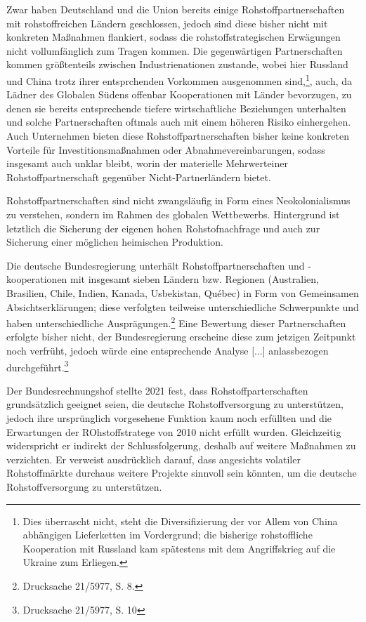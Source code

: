\documentclass[12pt,a4paper,oneside]{book} %
\begin{document}
Zwar haben Deutschland und die Union bereits einige Rohstoffpartnerschaften mit rohstoffreichen Ländern geschlossen, jedoch sind diese bisher nicht mit konkreten Maßnahmen flankiert, sodass die rohstoffstrategischen Erwägungen nicht vollumfänglich zum Tragen kommen. Die gegenwärtigen Partnerschaften kommen größtenteils zwischen Industrienationen zustande, wobei hier Russland und China trotz ihrer entsprchenden Vorkommen ausgenommen sind,\footnote{Dies überrascht nicht, steht die Diversifizierung der vor Allem von China abhängigen Lieferketten im Vordergrund; die bisherige rohstoffliche Kooperation mit Russland kam spätestens mit dem Angriffskrieg auf die Ukraine zum Erliegen.}, auch, da Lädner des Globalen Südens offenbar Kooperationen mit Länder bevorzugen, zu denen sie bereits entsprechende tiefere wirtschaftliche Beziehungen unterhalten und solche Partnerschaften oftmals auch mit einem höheren Risiko einhergehen.\autocite{Resilience of Critical Minerals Supply Chain, Cambirdge, S. 27} Auch Unternehmen bieten diese Rohstoffpartnerschaften bisher keine konkreten Vorteile für Investitionsmaßnahmen oder Abnahmevereinbarungen, sodass insgesamt auch unklar bleibt, worin der \glqq materielle Mehrwert\grqq einer Rohstoffpartnerschaft gegenüber Nicht-Partnerländern bietet.\autocite{KAS: Vom Rohstoff zur Lieferkette, S. 35} 

Rohstoffpartnerschaften sind nicht zwangsläufig in Form eines Neokolonialismus zu verstehen, sondern im Rahmen des globalen Wettbewerbs.\autocite{Frenz 2025, S. 1097-1098} Hintergrund ist letztlich die Sicherung der eigenen hohen Rohstofnachfrage und auch zur Sicherung einer möglichen heimischen Produktion.

Die deutsche Bundesregierung unterhält Rohstoffpartnerschaften und -kooperationen mit insgesamt sieben Ländern bzw. Regionen (Australien, Brasilien, Chile, Indien, Kanada, Usbekistan, Québec) in Form von Gemeinsamen Absichtserklärungen; diese verfolgten \glqq teilweise unterschiedliche Schwerpunkte und haben unterschiedliche Ausprägungen\grqq.\footnote{Drucksache 21/5977, S. 8.} Eine Bewertung dieser Partnerschaften erfolgte bisher nicht, der Bundesregierung erscheine diese \glqq zum jetzigen Zeitpunkt noch verfrüht\grqq, jedoch würde eine \glqq entsprechende Analyse [...] anlassbezogen durchgeführt.\grqq\footnote{Drucksache 21/5977, S. 10}

Der Bundesrechnungshof stellte 2021 fest, dass Rohstoffparterschaften grundsätzlich geeignet seien, die deutsche Rohstoffversorgung zu unterstützen, jedoch ihre ursprünglich vorgesehene Funktion kaum noch erfüllten und die Erwartungen der ROhstoffstratege von 2010 nicht erfüllt wurden.\autocite{bibid} Gleichzeitig widerspricht er indirekt der Schlussfolgerung, deshalb auf weitere Maßnahmen zu verzichten. Er verweist ausdrücklich darauf, dass angesichts volatiler Rohstoffmärkte durchaus weitere Projekte sinnvoll sein könnten, um die deutsche Rohstoffversorgung zu unterstützen.
\end{document}
